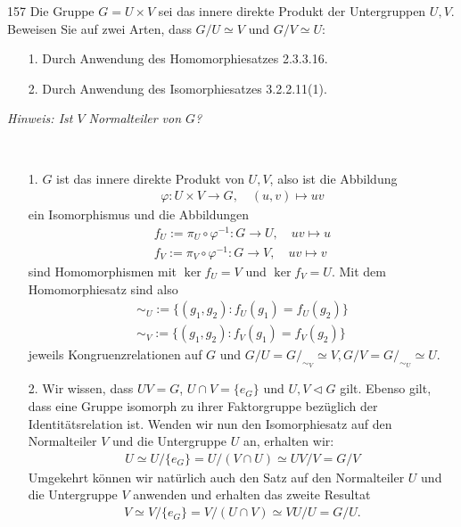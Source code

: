 \begin{algebraUE}{157}
Die Gruppe $G = U \times V$ sei das innere direkte Produkt der Untergruppen $U,V$.
Beweisen Sie auf zwei Arten, dass $G/U \simeq V$ und $G/V \simeq U$:
\begin{itemize}
  \item [1.] Durch Anwendung des Homomorphiesatzes 2.3.3.16.
  \item [2.] Durch Anwendung des Isomorphiesatzes 3.2.2.11(1).
\end{itemize}
\textit{Hinweis: Ist $V$ Normalteiler von $G$?}
\end{algebraUE}
\begin{solution}
\leavevmode \\
\begin{itemize}
  \item [1.] $G$ ist das innere direkte Produkt von $U,V$, also ist die Abbildung
  \begin{align*}
    \varphi: U \times V \rightarrow G, \quad (u,v) \mapsto uv
  \end{align*}
  ein Isomorphismus und die Abbildungen
  \begin{align*}
    f_U := \pi_U \circ \varphi^{-1}: G \rightarrow U, \quad uv \mapsto u \\
    f_V := \pi_V \circ \varphi^{-1}: G \rightarrow V, \quad uv \mapsto v
  \end{align*}
  sind Homomorphismen mit $\ker f_U = V$ und $\ker f_V = U$. Mit dem Homomorphiesatz sind also
  \begin{align*}
    \sim_U := \{(g_1,g_2): f_U(g_1) = f_U(g_2)\} \\
    \sim_V := \{(g_1,g_2): f_V(g_1) = f_V(g_2)\}
  \end{align*}
  jeweils Kongruenzrelationen auf $G$ und $G/U = G/_{\sim_V} \simeq V, G/V = G/_{\sim_U} \simeq U$.
  \item [2.] Wir wissen, dass $UV = G$, $U \cap V = \{e_G\}$ und $ U,V \vartriangleleft G$ gilt.
  Ebenso gilt, dass eine Gruppe isomorph zu ihrer Faktorgruppe bezüglich der Identitätsrelation ist.
  Wenden wir nun den Isomorphiesatz auf den Normalteiler $V$ und die Untergruppe $U$ an, erhalten wir:
  \begin{align*}
    U \simeq U/\{e_G\} = U/(V\cap U) \simeq UV/V = G/V
  \end{align*}
  Umgekehrt können wir natürlich auch den Satz auf den Normalteiler $U$ und die Untergruppe $V$ anwenden
  und erhalten das zweite Resultat
  \begin{align*}
    V \simeq V/\{e_G\} = V/(U\cap V) \simeq VU/U = G/U.
  \end{align*}
\end{itemize}
\end{solution}
